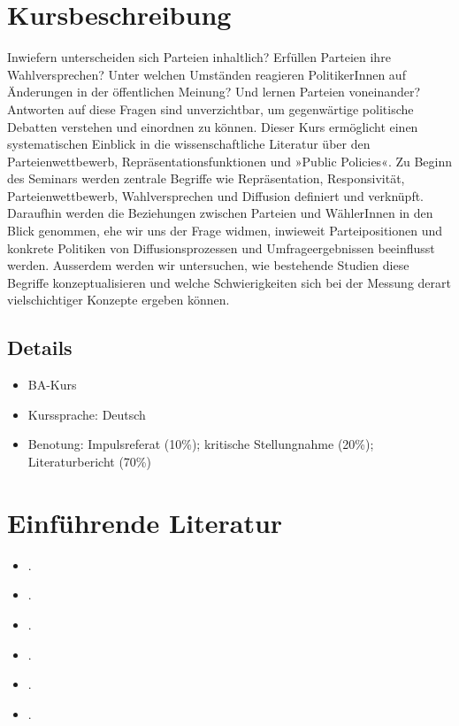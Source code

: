 \documentclass[abstract=on,parskip=full,headings=standardclasses,fontsize=11pt,paper=a4]{scrartcl}
\begin{document}
\section*{Kursbeschreibung}

Inwiefern unterscheiden sich Parteien inhaltlich? Erfüllen Parteien ihre Wahlversprechen? Unter welchen Umständen reagieren PolitikerInnen auf Änderungen in der öffentlichen Meinung? Und lernen Parteien voneinander? Antworten auf diese Fragen sind unverzichtbar, um gegenwärtige politische Debatten verstehen und einordnen zu können. Dieser Kurs ermöglicht einen systematischen Einblick in die wissenschaftliche Literatur über den Parteienwettbewerb, Repräsentationsfunktionen und »Public Policies«. Zu Beginn des Seminars werden zentrale Begriffe wie Repräsentation, Responsivität, Parteienwettbewerb, Wahlversprechen und Diffusion definiert und verknüpft. Daraufhin werden die Beziehungen zwischen Parteien und WählerInnen in den Blick genommen, ehe wir uns der Frage widmen, inwieweit Parteipositionen und konkrete Politiken von Diffusionsprozessen und Umfrageergebnissen beeinflusst werden. Ausserdem werden wir untersuchen, wie bestehende Studien diese Begriffe konzeptualisieren und welche Schwierigkeiten sich bei der Messung derart vielschichtiger Konzepte ergeben können.

\subsection*{Details}

\begin{itemize}
\item BA-Kurs
\item  Kurssprache: Deutsch
\item Benotung: Impulsreferat (10\%); kritische Stellungnahme (20\%); Literaturbericht (70\%)
\end{itemize}



\section*{Einführende Literatur}

\begin{itemize}
\item {}.
\item {}.
\item {}.
\item {}.
\item {}.
\item {}.
\end{itemize}
\end{document}
